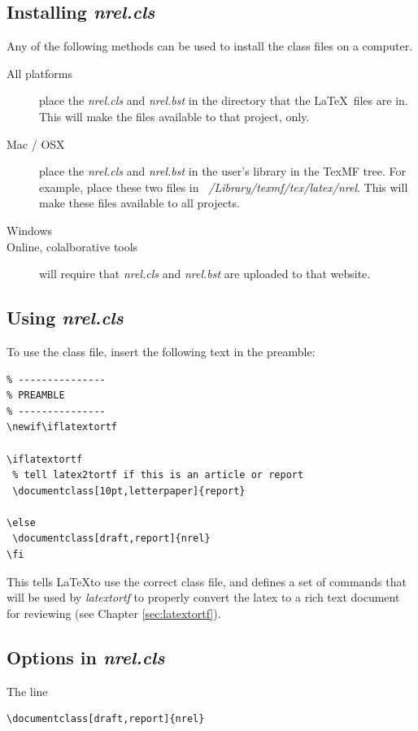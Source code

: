 \documentclass[12pt,letterpaper]{report}
\begin{document}
\subsection{Installing \emph{nrel.cls}}
Any of the following methods can be used to install the class files on a computer.
\begin{description}
\item[All platforms] place the \emph{nrel.cls} and \emph{nrel.bst} in the directory that the \LaTeX\ files are in. This will make the files available to that project, only.
\item[Mac / OSX] place the \emph{nrel.cls} and \emph{nrel.bst} in the user's library in the TexMF tree. For example, place these two files in \emph{~/Library/texmf/tex/latex/nrel}. This will make these files available to all projects.
\item[Windows]
\item[Online, colalborative tools] will require that \emph{nrel.cls} and \emph{nrel.bst} are uploaded to that website.
\end{description}

\subsection{Using \emph{nrel.cls}}
To use the class file, insert the following text in the preamble:

\begin{verbatim}
% ---------------
% PREAMBLE
% ---------------
\newif\iflatextortf

\iflatextortf
 % tell latex2tortf if this is an article or report
 \documentclass[10pt,letterpaper]{report}
 
\else
 \documentclass[draft,report]{nrel} 
\fi
\end{verbatim}

This tells \LaTeX to use the correct class file, and defines a set of commands that will be used by \emph{latextortf} to properly convert the latex to a rich text document for reviewing (see Chapter \ref{sec:latextortf}).

\subsection{Options in \emph{nrel.cls}\label{sec:nrel.cls.options}}
The line

\begin{verbatim}
\documentclass[draft,report]{nrel}
\end{verbatim}
\end{document}
